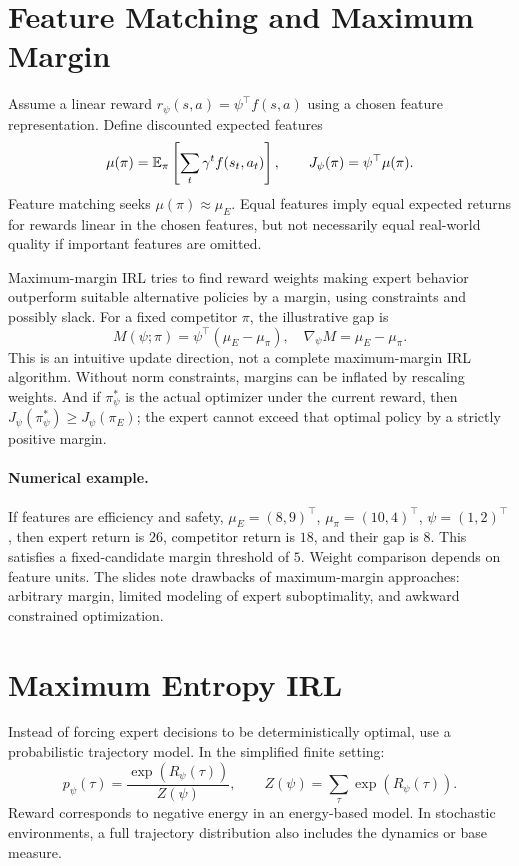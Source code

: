 \section{Feature Matching and Maximum Margin}
Assume a linear reward $r_\psi(s,a)=\psi^\top f(s,a)$ using a chosen feature representation. Define discounted expected features
\[
\mu(\pi)=\mathbb{E}_\pi\left[\sum_t\gamma^t f(s_t,a_t)\right],
\qquad J_\psi(\pi)=\psi^\top\mu(\pi).
\]
Feature matching seeks $\mu(\pi)\approx\mu_E$. Equal features imply equal expected returns for rewards linear in the chosen features, but not necessarily equal real-world quality if important features are omitted.

Maximum-margin IRL tries to find reward weights making expert behavior outperform suitable alternative policies by a margin, using constraints and possibly slack. For a fixed competitor $\pi$, the illustrative gap is
\[
M(\psi;\pi)=\psi^\top(\mu_E-\mu_\pi),\quad
\nabla_\psi M=\mu_E-\mu_\pi.
\]
This is an intuitive update direction, not a complete maximum-margin IRL algorithm. Without norm constraints, margins can be inflated by rescaling weights. And if $\pi_\psi^*$ is the actual optimizer under the current reward, then $J_\psi(\pi_\psi^*)\ge J_\psi(\pi_E)$; the expert cannot exceed that optimal policy by a strictly positive margin.

\paragraph{Numerical example.} If features are efficiency and safety,
$\mu_E=(8,9)^\top$, $\mu_\pi=(10,4)^\top$, $\psi=(1,2)^\top$,
then expert return is $26$, competitor return is $18$, and their gap is $8$. This satisfies a fixed-candidate margin threshold of $5$. Weight comparison depends on feature units.
The slides note drawbacks of maximum-margin approaches: arbitrary margin, limited modeling of expert suboptimality, and awkward constrained optimization.

\section{Maximum Entropy IRL}
Instead of forcing expert decisions to be deterministically optimal, use a probabilistic trajectory model. In the simplified finite setting:
\[
p_\psi(\tau)=\frac{\exp(R_\psi(\tau))}{Z(\psi)},\qquad
Z(\psi)=\sum_\tau\exp(R_\psi(\tau)).
\]
Reward corresponds to negative energy in an energy-based model. In stochastic environments, a full trajectory distribution also includes the dynamics or base measure.

